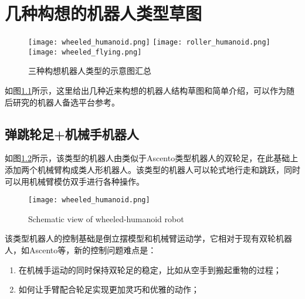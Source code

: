 
\chapter[几种构想的机器人类型草图]{几种构想的机器人类型草图}
\begin{figure}
  \centering
    {\texttt{[image: wheeled\_humanoid.png]}}
    {\texttt{[image: roller\_humanoid.png]}}
    {\texttt{[image: wheeled\_flying.png]}}
  \caption{三种构想机器人类型的示意图汇总}
  \label{fig:multi_image}
\end{figure}

如图\ref{fig:multi_image}所示，这里给出几种近来构想的机器人结构草图和简单介绍，可以作为随后研究的机器人备选平台参考。

\section[弹跳轮足+机械手机器人]{弹跳轮足+机械手机器人}
如图\ref{fig:wheeled_humanoid}所示，该类型的机器人由类似于Ascento\cite[p1]{Klemm_Morra_Salzmann_Tschopp_Bodie_Gulich_Kung_Mannhart_Pfister_Vierneisel_et_al_2019}类型机器人的双轮足，在此基础上添加两个机械臂构成类人形机器人。该类型的机器人可以轮式地行走和跳跃，同时可以用机械臂模仿双手进行各种操作。

\begin{figure}
  \centering
  \texttt{[image: wheeled\_humanoid.png]}
  \caption[wheeled_humanoid]{Schematic view of wheeled-humanoid robot}
  \label{fig:wheeled_humanoid}
\end{figure}

该类型机器人的控制基础是倒立摆模型和机械臂运动学，它相对于现有双轮机器人，如Ascento\cite[p1]{Klemm_Morra_Salzmann_Tschopp_Bodie_Gulich_Kung_Mannhart_Pfister_Vierneisel_et_al_2019}等，新的控制问题难点是：
\begin{enumerate}
  \item 在机械手运动的同时保持双轮足的稳定，比如从空手到搬起重物的过程；
  \item 如何让手臂配合轮足实现更加灵巧和优雅的动作；
\end{enumerate}

